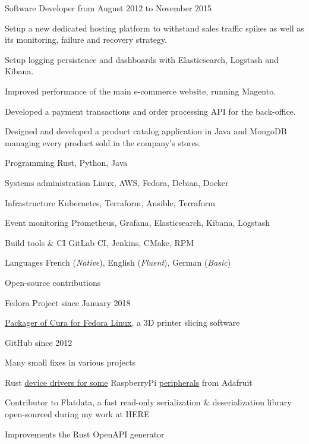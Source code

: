 \documentclass[10pt, a4paper]{awesome-cv}
\begin{document}
\begin{cventries}
	\cventry
	{Software Developer}
	{from August 2012 to November 2015}
	{
		\begin{cvitems}
			\item {Setup a new dedicated hosting platform to withstand sales traffic spikes as well as its monitoring, failure and recovery strategy.}
			\item {Setup logging persistence and dashboards with Elasticsearch, Logstash and Kibana.}
			\item {Improved performance of the main e-commerce website, running Magento.}
			\item {Developed a payment transactions and order processing API for the back-office.}
			\item {Designed and developed a product catalog application in Java and MongoDB managing every product sold in the company's stores.}
		\end{cvitems}
	}
\end{cventries}

\begin{cvskills}
	\cvskill
	{Programming}
	{Rust, Python, Java}

	\cvskill
	{Systems administration}
	{Linux, AWS, Fedora, Debian, Docker}

	\cvskill
	{Infrastructure}
	{Kubernetes, Terraform, Ansible, Terraform}

	\cvskill
	{Event monitoring}
	{Prometheus, Grafana, Elasticsearch, Kibana, Logstash}

	\cvskill
	{Build tools \& CI}
	{GitLab CI, Jenkins, CMake, RPM}

	\cvskill
	{Languages}
	{French (\emph{Native}), English (\emph{Fluent}), German (\emph{Basic})}
\end{cvskills}

\newpage

\begin{cventries}
	\cventrytitle
	{Open-source contributions}
	{}

	\cventry
	{Fedora Project}
	{since January 2018}
	{
		\begin{cvitems}
			\item{\href{https://src.fedoraproject.org/rpms/cura}{Packager of Cura for Fedora Linux}, a 3D printer slicing software}
		\end{cvitems}
	}

	\cventry
	{GitHub}
	{since 2012}
	{
		\begin{cvitems}
			\item {Many small fixes in various projects}
			\item {Rust \href{https://github.com/gferon/rustberrypi-playground}{device drivers for some} RaspberryPi \href{https://github.com/gferon/am2320.rs}{peripherals} from Adafruit}
			\item {Contributor to Flatdata, a fast read-only serialization \& deserialization library open-sourced during my work at HERE}
			\item {Improvements the Rust OpenAPI generator}
		\end{cvitems}
	}
\end{cventries}
\end{document}
